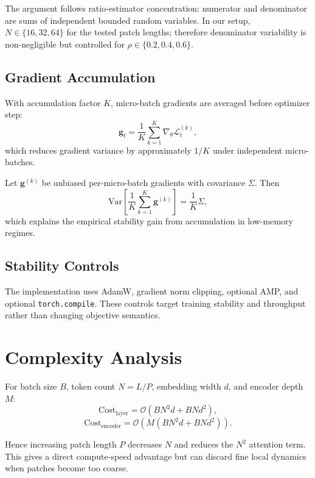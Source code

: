 \documentclass[conference]{IEEEtran}
\begin{document}
The argument follows ratio-estimator concentration: numerator and denominator are sums of independent bounded random variables. In our setup, $N \in \{16, 32, 64\}$ for the tested patch lengths; therefore denominator variability is non-negligible but controlled for $\rho\in\{0.2,0.4,0.6\}$.

\subsection{Gradient Accumulation}
With accumulation factor $K$, micro-batch gradients are averaged before optimizer step:
\begin{equation}
\mathbf{g}_t = \frac{1}{K}\sum_{k=1}^{K} \nabla_\theta \mathcal{L}^{(k)}_t,
\label{eq:gradacc}
\end{equation}
which reduces gradient variance by approximately $1/K$ under independent micro-batches.

Let $\mathbf{g}^{(k)}$ be unbiased per-micro-batch gradients with covariance $\Sigma$. Then
\begin{equation}
\mathrm{Var}\!\left[\frac{1}{K}\sum_{k=1}^{K}\mathbf{g}^{(k)}\right] = \frac{1}{K}\Sigma,
\label{eq:gradvar}
\end{equation}
which explains the empirical stability gain from accumulation in low-memory regimes.

\subsection{Stability Controls}
The implementation uses AdamW, gradient norm clipping, optional AMP, and optional \texttt{torch.compile}. These controls target training stability and throughput rather than changing objective semantics.

\section{Complexity Analysis}
For batch size $B$, token count $N=L/P$, embedding width $d$, and encoder depth $M$:
\begin{equation}
\text{Cost}_{\text{layer}} = \mathcal{O}(B N^2 d + B N d^2),
\label{eq:layercost}
\end{equation}
\begin{equation}
\text{Cost}_{\text{encoder}} = \mathcal{O}\left(M(B N^2 d + B N d^2)\right).
\label{eq:encodercost}
\end{equation}

Hence increasing patch length $P$ decreases $N$ and reduces the $N^2$ attention term. This gives a direct compute-speed advantage but can discard fine local dynamics when patches become too coarse.
\end{document}
